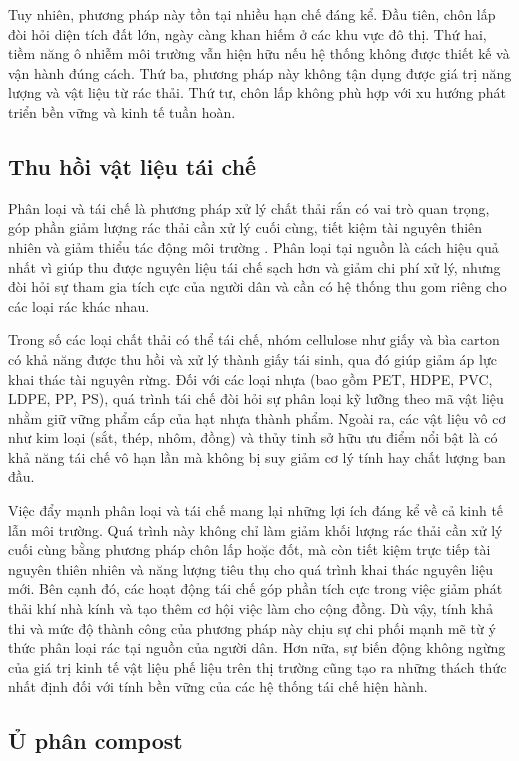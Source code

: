 \documentclass[../main.tex]{subfiles}
\begin{document}
Tuy nhiên, phương pháp này tồn tại nhiều hạn chế đáng kể. Đầu tiên, chôn lấp đòi hỏi diện tích đất lớn, ngày càng khan hiếm ở các khu vực đô thị. Thứ hai, tiềm năng ô nhiễm môi trường vẫn hiện hữu nếu hệ thống không được thiết kế và vận hành đúng cách. Thứ ba, phương pháp này không tận dụng được giá trị năng lượng và vật liệu từ rác thải. Thứ tư, chôn lấp không phù hợp với xu hướng phát triển bền vững và kinh tế tuần hoàn.

\subsection{Thu hồi vật liệu tái chế}

Phân loại và tái chế là phương pháp xử lý chất thải rắn có vai trò quan trọng, góp phần giảm lượng rác thải cần xử lý cuối cùng, tiết kiệm tài nguyên thiên nhiên và giảm thiểu tác động môi trường \cite{Hopewell2009}. Phân loại tại nguồn là cách hiệu quả nhất vì giúp thu được nguyên liệu tái chế sạch hơn và giảm chi phí xử lý, nhưng đòi hỏi sự tham gia tích cực của người dân và cần có hệ thống thu gom riêng cho các loại rác khác nhau.

Trong số các loại chất thải có thể tái chế, nhóm cellulose như giấy và bìa carton có khả năng được thu hồi và xử lý thành giấy tái sinh, qua đó giúp giảm áp lực khai thác tài nguyên rừng. Đối với các loại nhựa (bao gồm PET, HDPE, PVC, LDPE, PP, PS), quá trình tái chế đòi hỏi sự phân loại kỹ lưỡng theo mã vật liệu nhằm giữ vững phẩm cấp của hạt nhựa thành phẩm. Ngoài ra, các vật liệu vô cơ như kim loại (sắt, thép, nhôm, đồng) và thủy tinh sở hữu ưu điểm nổi bật là có khả năng tái chế vô hạn lần mà không bị suy giảm cơ lý tính hay chất lượng ban đầu.

Việc đẩy mạnh phân loại và tái chế mang lại những lợi ích đáng kể về cả kinh tế lẫn môi trường. Quá trình này không chỉ làm giảm khối lượng rác thải cần xử lý cuối cùng bằng phương pháp chôn lấp hoặc đốt, mà còn tiết kiệm trực tiếp tài nguyên thiên nhiên và năng lượng tiêu thụ cho quá trình khai thác nguyên liệu mới. Bên cạnh đó, các hoạt động tái chế góp phần tích cực trong việc giảm phát thải khí nhà kính và tạo thêm cơ hội việc làm cho cộng đồng. Dù vậy, tính khả thi và mức độ thành công của phương pháp này chịu sự chi phối mạnh mẽ từ ý thức phân loại rác tại nguồn của người dân. Hơn nữa, sự biến động không ngừng của giá trị kinh tế vật liệu phế liệu trên thị trường cũng tạo ra những thách thức nhất định đối với tính bền vững của các hệ thống tái chế hiện hành.

\subsection{Ủ phân compost}
\end{document}
